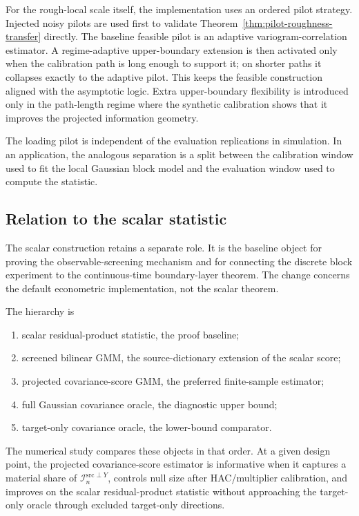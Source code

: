 \documentclass[11pt,a4paper]{amsart}
\theoremstyle{plain}
\theoremstyle{definition}
\theoremstyle{remark}
\newcommand{\scrI}{\mathcal{I}}
\begin{document}
For the rough-local scale itself, the implementation uses an ordered pilot strategy.  Injected
noisy pilots are used first to validate Theorem~\ref{thm:pilot-roughness-transfer} directly.  The
baseline feasible pilot is an adaptive variogram-correlation estimator.  A regime-adaptive
upper-boundary extension is then activated only when the calibration path is long enough to support
it; on shorter paths it collapses exactly to the adaptive pilot.  This keeps the feasible
construction aligned with the asymptotic logic.  Extra upper-boundary flexibility is introduced
only in the path-length regime where the synthetic calibration shows that it improves the projected
information geometry.

The loading pilot is independent of the evaluation replications in simulation.  In an
application, the analogous separation is a split between the calibration window used to fit the
local Gaussian block model and the evaluation window used to compute the statistic.

\subsection{Relation to the scalar statistic}

The scalar construction retains a separate role.  It is the baseline object for proving the
observable-screening mechanism and for connecting the discrete block experiment to the continuous-time boundary-layer theorem.  The change concerns the default econometric implementation, not the
scalar theorem.

The hierarchy is
\begin{enumerate}[label=(\roman*)]
\item scalar residual-product statistic, the proof baseline;
\item screened bilinear GMM, the source-dictionary extension of the scalar score;
\item projected covariance-score GMM, the preferred finite-sample estimator;
\item full Gaussian covariance oracle, the diagnostic upper bound;
\item target-only covariance oracle, the lower-bound comparator.
\end{enumerate}

The numerical study compares these objects in that order.  At a given design point, the projected
covariance-score estimator is informative when it captures a material share of
\(\scrI_n^{\mathrm{src}\perp Y}\), controls null size after HAC/multiplier calibration, and improves
on the scalar residual-product statistic without approaching the target-only oracle through
excluded target-only directions.
\end{document}
